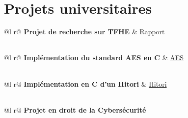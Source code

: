 \documentclass[a4paper,12pt]{article}
\begin{document}
\section{Projets universitaires}

\begin{tabularx}{\linewidth}{ @{}l r@{} }
\textbf{Projet de recherche sur TFHE} & \hfill \href{https://nicolasmendelboucharin.github.io/Moromat/fiches/Projet_TFHE.pdf}{Rapport} \\[3.75pt]
  \\
\end{tabularx}

\begin{tabularx}{\linewidth}{ @{}l r@{} }
\textbf{Implémentation du standard AES en C} & \hfill \href{https://github.com/NicolasMendelBoucharin/TPS/tree/main/AES}{AES} \\[3.75pt]
  \\
\end{tabularx}

\begin{tabularx}{\linewidth}{ @{}l r@{} }
\textbf{Implémentation en C d'un Hitori} & \hfill \href{https://github.com/NicolasMendelBoucharin/TPS/tree/main/hitori}{Hitori} \\[3.75pt]
  \\
\end{tabularx}

\begin{tabularx}{\linewidth}{ @{}l r@{} }
\textbf{Projet en droit de la Cybersécurité}\\ %
  \\
\end{tabularx}



\end{document}
